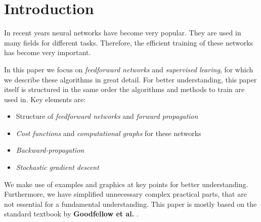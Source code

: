 \section{Introduction}
\label{sec:introduction}

In recent years neural networks have become very popular.
They are used in many fields for different tasks.
Therefore, the efficient training of these networks has become very important.

In this paper we focus on \emph{feedforward networks} and \emph{supervised learing}, for which we describe these algorithms in great detail.
For better understanding, this paper itself is structured in the same order the algorithms and methods to train are used in.
Key elements are:
\begin{itemize}
    \item Structure of \emph{feedforward networks} and \emph{forward propagation}
    \item \emph{Cost functions} and \emph{computational graphs} for these networks
    \item \emph{Backward-propagation}
    \item \emph{Stochastic gradient descent}
\end{itemize}
We make use of examples and graphics at key points for better understanding.
Furthermore, we have simplified unnecessary complex practical parts, that are not essential for a fundamental understanding.
This paper is mostly based on the standard textbook by \textbf{Goodfellow et al.} \cite{Goodfellow-et-al-2016}.
